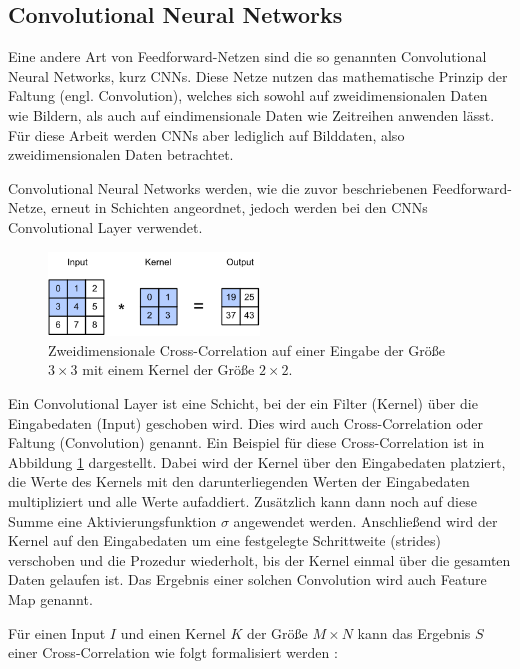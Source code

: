 \subsection{Convolutional Neural Networks}
\label{cnns}
Eine andere Art von Feedforward-Netzen sind die so genannten Convolutional Neural Networks, kurz CNNs. Diese Netze nutzen das mathematische Prinzip der Faltung (engl. Convolution), welches sich sowohl auf zweidimensionalen Daten wie Bildern, als auch auf eindimensionale Daten wie Zeitreihen anwenden lässt. Für diese Arbeit werden CNNs aber lediglich auf Bilddaten, also zweidimensionalen Daten betrachtet.

Convolutional Neural Networks werden, wie die zuvor beschriebenen Feedforward-Netze, erneut in Schichten angeordnet, jedoch werden bei den CNNs Convolutional Layer verwendet.

\begin{figure}[htbp]
\centerline{\includegraphics[width=0.5\textwidth]{content/images/convolution.png}}
\caption{Zweidimensionale Cross-Correlation auf einer Eingabe der Größe $3 \times 3$ mit einem Kernel der Größe $2 \times 2$. \cite{zhang_dive_2020}}
\label{f2.2}
\end{figure}

Ein Convolutional Layer ist eine Schicht, bei der ein Filter (Kernel) über die Eingabedaten (Input) geschoben wird. Dies wird auch Cross-Correlation oder Faltung (Convolution) genannt. Ein Beispiel für diese Cross-Correlation ist in Abbildung \ref{f2.2} dargestellt. Dabei wird der Kernel über den Eingabedaten platziert, die Werte des Kernels mit den darunterliegenden Werten der Eingabedaten multipliziert und alle Werte aufaddiert. Zusätzlich kann dann noch auf diese Summe eine Aktivierungsfunktion $\sigma$ angewendet werden. Anschließend wird der Kernel auf den Eingabedaten um eine festgelegte Schrittweite (strides) verschoben und die Prozedur wiederholt, bis der Kernel einmal über die gesamten Daten gelaufen ist. Das Ergebnis einer solchen Convolution wird auch Feature Map genannt.

Für einen Input $I$ und einen Kernel $K$ der Größe $M \times N$ kann das Ergebnis $S$ einer Cross-Correlation wie folgt formalisiert werden \cite{frochte_maschinelles_2019}:


